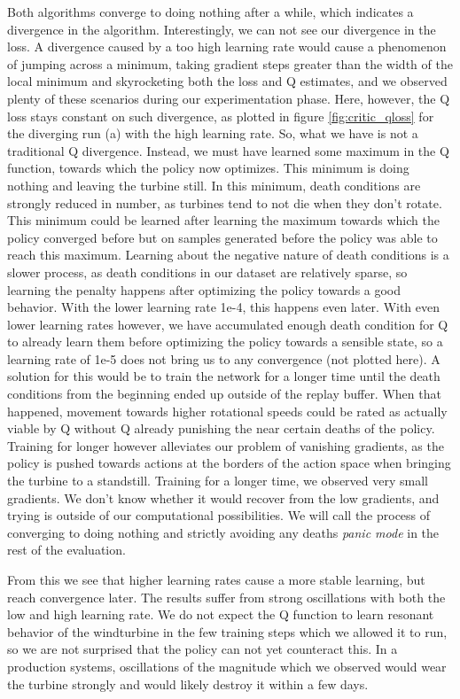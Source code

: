 \documentclass[hyperref,final,beleg]{cgvpub}
\begin{document}
Both algorithms converge to doing nothing after a while, which indicates a divergence in the algorithm. Interestingly, we can not see our divergence in the loss. A divergence caused by a too high learning rate would cause a phenomenon of jumping across a minimum, taking gradient steps greater than the width of the local minimum and skyrocketing both the loss and Q estimates, and we observed plenty of these scenarios during our experimentation phase. Here, however, the Q loss stays constant on such divergence, as plotted in figure \ref{fig:critic_qloss} for the diverging run (a) with the high learning rate. So, what we have is not a traditional Q divergence. Instead, we must have learned some maximum in the Q function, towards which the policy now optimizes. This minimum is doing nothing and leaving the turbine still. In this minimum, death conditions are strongly reduced in number, as turbines tend to not die when they don't rotate. This minimum could be learned after learning the maximum towards which the policy converged before but on samples generated before the policy was able to reach this maximum. Learning about the negative nature of death conditions is a slower process, as death conditions in our dataset are relatively sparse, so learning the penalty happens after optimizing the policy towards a good behavior. With the lower learning rate 1e-4, this happens even later. With even lower learning rates however, we have accumulated enough death condition for Q to already learn them before optimizing the policy towards a sensible state, so a learning rate of 1e-5 does not bring us to any convergence (not plotted here). A solution for this would be to train the network for a longer time until the death conditions from the beginning ended up outside of the replay buffer. When that happened, movement towards higher rotational speeds could be rated as actually viable by Q without Q already punishing the near certain deaths of the policy. Training for longer however alleviates our problem of vanishing gradients, as the policy is pushed towards actions at the borders of the action space when bringing the turbine to a standstill. Training for a longer time, we observed very small gradients. We don't know whether it would recover from the low gradients, and trying is outside of our computational possibilities. We will call the process of converging to doing nothing and strictly avoiding any deaths \textit{panic mode} in the rest of the evaluation.

From this we see that higher learning rates cause a more stable learning, but reach convergence later. The results suffer from strong oscillations with both the low and high learning rate. We do not expect the Q function to learn resonant behavior of the windturbine in the few training steps which we allowed it to run, so we are not surprised that the policy can not yet counteract this. In a production systems, oscillations of the magnitude which we observed would wear the turbine strongly and would likely destroy it within a few days.
\end{document}
